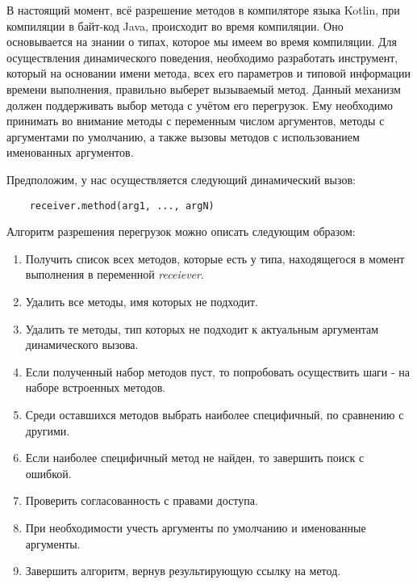 В настоящий момент, всё разрешение методов в компиляторе языка Kotlin, при компиляции в байт-код Java, происходит во время компиляции. Оно основывается на знании о типах, которое мы имеем во время компиляции. Для осуществления динамического поведения, необходимо разработать инструмент, который на основании имени метода, всех его параметров и типовой информации времени
выполнения, правильно выберет вызываемый метод. Данный механизм должен поддерживать выбор метода с учётом его перегрузок. Ему необходимо принимать во внимание методы с переменным числом аргументов, методы с аргументами по умолчанию, а также вызовы методов с использованием именованных аргументов.

Предположим, у нас осуществляется следующий динамический вызов:

\begin{verbatim}
    receiver.method(arg1, ..., argN)
\end{verbatim}

Алгоритм разрешения перегрузок можно описать следующим образом:

\begin{enumerate}
    \item Получить список всех методов, которые есть у типа, находящегося в момент выполнения в переменной \textit{receiever}.
    \item Удалить все методы, имя которых не подходит.\label{itm:del1}
    \item Удалить те методы, тип которых не подходит к актуальным аргументам динамического вызова.\label{itm:del2}
    \item Если полученный набор методов пуст, то попробовать осуществить шаги \label{itm:del1}-\label{itm:del2} на наборе встроенных методов.
    \item Среди оставшихся методов выбрать наиболее специфичный, по сравнению с другими.
    \item Если наиболее специфичный метод не найден, то завершить поиск с ошибкой.
    \item Проверить согласованность с правами доступа.
    \item При необходимости учесть аргументы по умолчанию и именованные аргументы.
    \item Завершить алгоритм, вернув результирующую ссылку на метод.
\end{enumerate}

